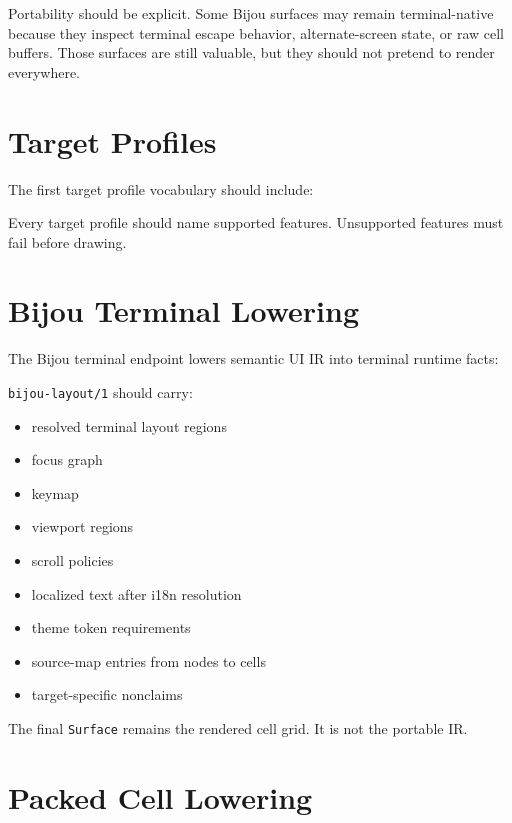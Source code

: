 Portability should be explicit. Some Bijou surfaces may remain terminal-native because they inspect terminal escape behavior, alternate-screen state, or raw cell buffers. Those surfaces are still valuable, but they should not pretend to render everywhere.

\section{Target Profiles}\label{record-139-target-profiles}

The first target profile vocabulary should include:



Every target profile should name supported features. Unsupported features must fail before drawing.

\section{Bijou Terminal Lowering}\label{record-139-bijou-terminal-lowering}

The Bijou terminal endpoint lowers semantic UI IR into terminal runtime facts:



\texttt{b\allowbreak{}i\allowbreak{}j\allowbreak{}o\allowbreak{}u\allowbreak{}-\allowbreak{}l\allowbreak{}a\allowbreak{}y\allowbreak{}o\allowbreak{}u\allowbreak{}t\allowbreak{}/\allowbreak{}1} should carry:

\begin{itemize}
\tightlist
\item
  resolved terminal layout regions
\item
  focus graph
\item
  keymap
\item
  viewport regions
\item
  scroll policies
\item
  localized text after i18n resolution
\item
  theme token requirements
\item
  source-map entries from nodes to cells
\item
  target-specific nonclaims
\end{itemize}

The final \texttt{S\allowbreak{}u\allowbreak{}r\allowbreak{}f\allowbreak{}a\allowbreak{}c\allowbreak{}e} remains the rendered cell grid. It is not the portable IR.

\section{Packed Cell Lowering}\label{record-139-packed-cell-lowering}

